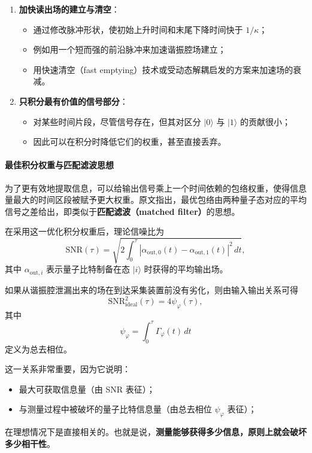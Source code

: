 \documentclass[12pt,a4paper,oneside]{ctexbook}
\begin{document}
\begin{enumerate}
    \item \textbf{加快读出场的建立与清空}：
    \begin{itemize}
        \item 通过修改脉冲形状，使初始上升时间和末尾下降时间快于 \(1/\kappa\)；
        \item 例如用一个短而强的前沿脉冲来加速谐振腔场建立；
        \item 用快速清空（fast emptying）技术或受动态解耦启发的方案来加速场的衰减。
    \end{itemize}

    \item \textbf{只积分最有价值的信号部分}：
    \begin{itemize}
        \item 对某些时间片段，尽管信号存在，但其对区分 \(|0\rangle\) 与 \(|1\rangle\) 的贡献很小；
        \item 因此可以在积分时降低它们的权重，甚至直接丢弃。
    \end{itemize}
\end{enumerate}

\paragraph{最佳积分权重与匹配滤波思想}
为了更有效地提取信息，可以给输出信号乘上一个时间依赖的包络权重，使得信息量最大的时间区段被赋予更大权重。原文指出，最优包络由两种量子态对应的平均信号之差给出，即类似于\textbf{匹配滤波（matched filter）}的思想。

在采用这一优化积分权重后，理论信噪比为
\begin{equation}
\mathrm{SNR}(\tau)
=
\sqrt{
2\int_0^\tau
|\alpha_{\mathrm{out},0}(t)-\alpha_{\mathrm{out},1}(t)|^2\,dt
},
\tag{67}
\end{equation}
其中 \(\alpha_{\mathrm{out},i}\) 表示量子比特制备在态 \(|i\rangle\) 时获得的平均输出场。

如果从谐振腔泄漏出来的场在到达采集装置前没有劣化，则由输入输出关系可得
\[
\mathrm{SNR}^2_{\mathrm{ideal}}(\tau)=4\psi_\varphi(\tau),
\]
其中
\[
\psi_\varphi=\int_0^\tau \Gamma_\varphi(t)\,dt
\]
定义为总去相位。

这一关系非常重要，因为它说明：
\begin{itemize}
    \item 最大可获取信息量（由 SNR 表征）；
    \item 与测量过程中被破坏的量子比特信息量（由总去相位 \(\psi_\varphi\) 表征）；
\end{itemize}
在理想情况下是直接相关的。也就是说，\textbf{测量能够获得多少信息，原则上就会破坏多少相干性}。
\end{document}

